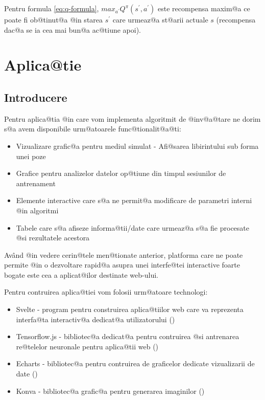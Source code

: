 Pentru formula \ref{eq:q-formula}, $max_{a^{\prime}} Q^{\pi}(s^{\prime}, a^{\prime})$ este recompensa maxim@a ce poate fi ob@tinut@a @in starea $s^{\prime}$ care urmeaz@a st@arii actuale $s$ (recompensa dac@a se ia cea mai bun@a ac@tiune apoi).

\chapter{Aplica@tie}

\section{Introducere}
Pentru aplica@tia @in care vom implementa algoritmit de @inv@a@tare ne dorim s@a avem disponibile urm@atoarele func@tionalit@a@ti:

\begin{itemize}
	\item Vizualizare grafic@a pentru mediul simulat - Afi@sarea libirintului sub forma unei poze
	\item Grafice pentru analizelor datelor op@tiune din timpul sesiunilor de antrenament
	\item Elemente interactive care s@a ne permit@a modificare de parametri interni @in algoritmi
	\item Tabele care s@a afiseze informa@tii/date care urmeaz@a s@a fie procesate @si rezultatele acestora
\end{itemize}

Av\^ and @in vedere cerin@tele men@tionate anterior, platforma care ne poate permite @in o dezvoltare rapid@a asupra unei interfe@tei interactive foarte bogate este cea a aplicat@ilor destinate web-ului.

Pentru contruirea aplica@tiei vom folosii urm@atoare technologi:

\begin{itemize}
	\item Svelte - program pentru construirea aplica@tiilor web care va reprezenta interfa@ta interactiv@a dedicat@a utilizatorului (\cite{Svelte})
	\item Tensorflow.js - bibliotec@a dedicat@a pentru contruirea @si antrenarea re@telelor neuronale pentru aplica@tii web (\cite{TensorflowJs})
	\item Echarts - bibliotec@a pentru contruirea de graficelor dedicate vizualizarii de date (\cite{Echarts})
	\item Konva - bibliotec@a grafic@a pentru generarea imaginilor (\cite{Konva})
\end{itemize} 

